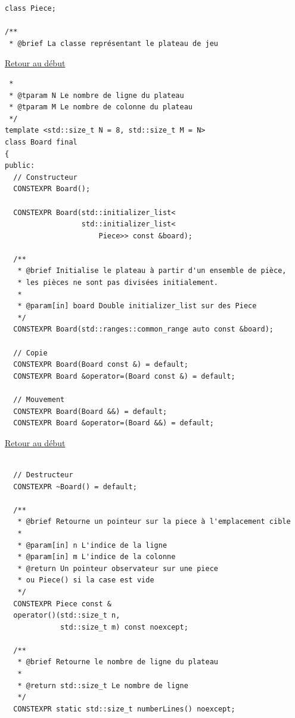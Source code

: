 {\begin{frame}[fragile]
\begin{verbatim}
class Piece;

/**
 * @brief La classe représentant le plateau de jeu
\end{verbatim}
\end{frame}

\begin{frame}[fragile]
\hyperlink{conclusion}{Retour au début}\newline
\begin{verbatim}
 *
 * @tparam N Le nombre de ligne du plateau
 * @tparam M Le nombre de colonne du plateau
 */
template <std::size_t N = 8, std::size_t M = N>
class Board final
{
public:
  // Constructeur
  CONSTEXPR Board();

  CONSTEXPR Board(std::initializer_list<
                  std::initializer_list<
                      Piece>> const &board);

  /**
   * @brief Initialise le plateau à partir d'un ensemble de pièce,
   * les pièces ne sont pas divisées initialement.
   *
   * @param[in] board Double initializer_list sur des Piece
   */
  CONSTEXPR Board(std::ranges::common_range auto const &board);

  // Copie
  CONSTEXPR Board(Board const &) = default;
  CONSTEXPR Board &operator=(Board const &) = default;

  // Mouvement
  CONSTEXPR Board(Board &&) = default;
  CONSTEXPR Board &operator=(Board &&) = default;
\end{verbatim}
\end{frame}

\begin{frame}[fragile]
\hyperlink{conclusion}{Retour au début}\newline
\begin{verbatim}

  // Destructeur
  CONSTEXPR ~Board() = default;

  /**
   * @brief Retourne un pointeur sur la piece à l'emplacement cible
   *
   * @param[in] n L'indice de la ligne
   * @param[in] m L'indice de la colonne
   * @return Un pointeur observateur sur une piece
   * ou Piece() si la case est vide
   */
  CONSTEXPR Piece const &
  operator()(std::size_t n,
             std::size_t m) const noexcept;

  /**
   * @brief Retourne le nombre de ligne du plateau
   *
   * @return std::size_t Le nombre de ligne
   */
  CONSTEXPR static std::size_t numberLines() noexcept;


\end{verbatim}
\end{frame}}
